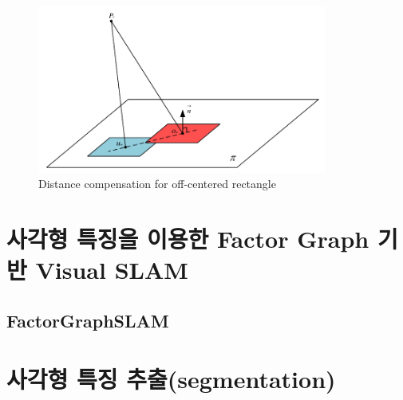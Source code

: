 \documentclass[master,korean,final]{cbnu-ecs}
\begin{document}
\begin{figure}[!ht]
  \centering
	\includegraphics[width=360px]{img/depth_compensate_cropped.pdf}
  \caption{Distance compensation for off-centered rectangle}
\label{depth_compensate}
\end{figure}

\chapter{사각형 특징을 이용한 Factor Graph 기반 Visual SLAM}
\section{FactorGraphSLAM}
\cite{Dellaert2006}%
\cite{Kaess2007}%
\cite{Kaess2011}%

\chapter{사각형 특징 추출(segmentation)}
\cite{Zhang2003}%
\cite{Han2009}%
\cite{Wildenauer2008}%
\cite{Jung2004}%
\cite{Bazin2007}%
\cite{Bhaskar2010}%
\end{document}
